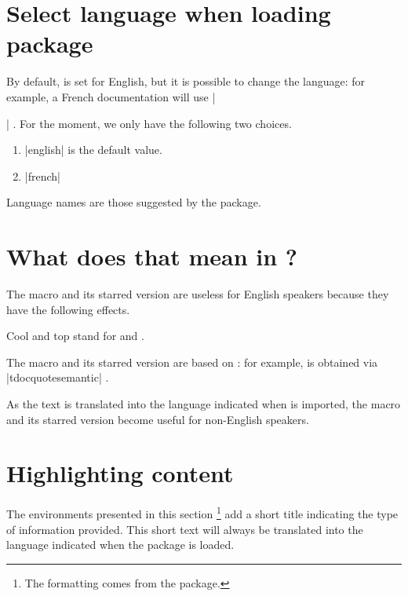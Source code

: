 \section{Select language when loading package}

By default, \thispack{} is set for English, but it is possible to change the language: for example, a French documentation will use \tdocinlatex|\usepackage[lang = french]{tutodoc}| .
For the moment, we only have the following two choices.

\begin{enumerate}
    \item \tdocinlatex|english| is the default value.

    \item \tdocinlatex|french|
\end{enumerate}


\begin{tdocnote}
    Language names are those suggested by the  package.
\end{tdocnote}


\section{What does that mean in ?}

The macro  and its starred version are useless for English speakers because they have the following effects.


\begin{tdoclatex}
Cool and top stand for  and .
\end{tdoclatex}


The macro  and its starred version are based on  : for example,  is obtained via \tdocinlatex|tdocquote{semantic}| .


\begin{tdocnote}
    As the text  is translated into the language indicated when \thispack{} is imported, the macro  and its starred version become useful for non-English speakers.
\end{tdocnote}


\section{Highlighting content}

\begin{tdocnote}
    The environments presented in this section
    \footnote{
        The formatting comes from the  package.
    }
    add a short title indicating the type of information provided.
    This short text will always be translated into the language indicated when the \thispack{} package is loaded.
\end{tdocnote}


